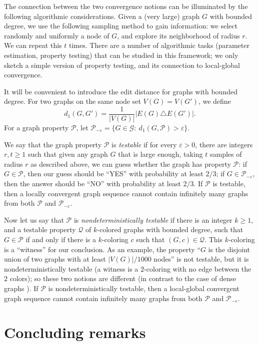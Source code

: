 \documentclass{article}
\def\GG{\mathcal{G}}\def\HH{\mathcal{H}}\def\II{\mathcal{I}}
\def\PP{\mathcal{P}}\def\QQ{\mathcal{Q}}\def\RR{\mathcal{R}}
\def\eps{\varepsilon}
\begin{document}
\medskip

 The connection
between the two convergence notions can be illuminated by the
following algorithmic considerations. Given a (very large) graph $G$
with bounded degree, we use the following sampling method to gain
information: we select randomly and uniformly a node of $G$, and
explore its neighborhood of radius $r$. We can repeat this $t$ times.
There are a number of algorithmic tasks (parameter estimation,
property testing) that can be studied in this framework; we only
sketch a simple version of property testing, and its connection to
local-global convergence.

It will be convenient to introduce the edit distance for graphs with
bounded degree. For two graphs on the same node set $V(G)=V(G')$, we
define
\[
d_1(G,G') = \frac{1}{|V(G)|}|E(G)\triangle E(G')|.
\]
For a graph property $\PP$, let
$\PP_{-\eps}=\{G\in\GG:~d_1(G,\PP)>\eps\}$.

We say that the graph property $\PP$ is \emph{testable} if for every
$\eps>0$, there are integers $r,t\ge 1$ such that given any graph $G$
that is large enough, taking $t$ samples of radius $r$ as described
above, we can guess whether the graph has property $\PP$: if
$G\in\PP$, then our guess should be ``YES'' with probability at least
$2/3$; if $G\in\PP_{-\eps}$, then the answer should be ``NO'' with
probability at least $2/3$. If  $\PP$ is testable, then a locally
convergent graph sequence cannot contain infinitely many graphs from
both $\PP$ and $\PP_{-\eps}$.

Now let us say that $\PP$ is \emph{nondeterministically testable} if
there is an integer $k\ge1$, and a testable property $\QQ$ of
$k$-colored graphs with bounded degree, such that $G\in\PP$ if and
only if there is a $k$-coloring $c$ such that $(G,c)\in\QQ$. This
$k$-coloring is a ``witness'' for our conclusion. As an example, the
property ``$G$ is the disjoint union of two graphs with at least
$|V(G)|/1000$ nodes'' is not testable, but it is nondeterministically
testable (a witness is a $2$-coloring with no edge between the $2$
colors); {so these two notions are different (in contrast to the case
of dense graphs \cite{LV}).} If $\PP$ is nondeterministically
testable, then a local-global convergent graph sequence cannot
contain infinitely many graphs from both $\PP$ and $\PP_{-\eps}$.

\section{Concluding remarks}\label{sec:concluding}
\end{document}

